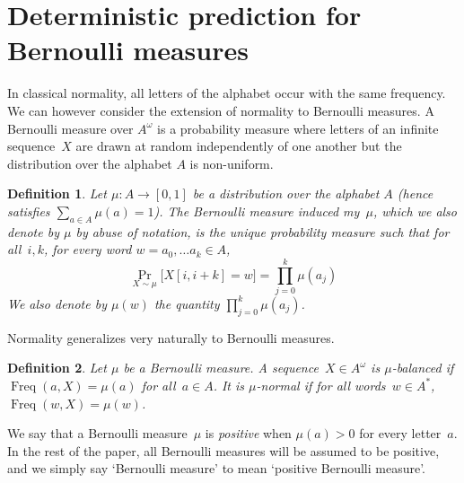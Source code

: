\documentclass[11pt]{article}
\newtheorem{definition}{Definition}
\DeclareMathOperator{\freq}{Freq}
\begin{document}
\section{Deterministic prediction for Bernoulli measures}

In classical normality, all letters of the alphabet occur with the same frequency. We can however consider the extension of normality to Bernoulli measures. A Bernoulli measure over $A^\omega$ is a probability measure where letters of an infinite sequence~$X$ are drawn at random independently of one another but the distribution over the alphabet $A$ is non-uniform. 

\begin{definition}
Let  $\mu: A \rightarrow [0,1]$ be a distribution over the alphabet $A$ (hence satisfies $\sum_{a \in A} \mu(a) = 1$). The Bernoulli measure induced my~$\mu$, which we also denote by $\mu$ by abuse of notation, is the unique probability measure such that for all~$i,k$, for every word $w=a_0, \ldots a_k \in A$,
\[
\Pr_{X \sim \mu} \Big[ X[i,i+k]=w \Big]= \prod_{j=0}^k \mu(a_{j})
\]
We also denote by $\mu(w)$ the quantity $\prod_{j=0}^k \mu(a_{j})$.    
\end{definition}

Normality generalizes very naturally to Bernoulli measures. 


\begin{definition}
Let $\mu$ be a Bernoulli measure. A sequence~$X \in A^\omega$ is \emph{$\mu$-balanced} if $\freq(a,X)=\mu(a)$ for all~$a \in A$. It is \emph{$\mu$-normal} if for all words~$w \in A^*$, $\freq(w,X)=\mu(w)$.
\end{definition}

We say that a Bernoulli measure~$\mu$ is \emph{positive} when $\mu(a)>0$ for every letter~$a$. In the rest of the paper, all Bernoulli measures will be assumed to be positive, and we simply say `Bernoulli measure' to mean `positive Bernoulli measure'. 
\end{document}
